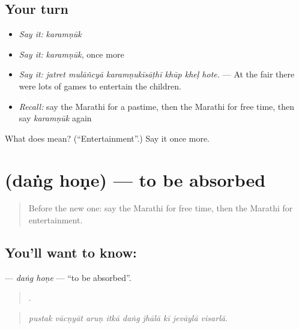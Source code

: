 \subsection*{Your turn}
\begin{itemize}
\raggedright
  \item \emph{Say it:} \emph{karamṇūk}
  \item \emph{Say it:} \emph{karamṇūk}, once more
  \item \emph{Say it:} \emph{jatret mulāñcyā karamṇukīsāṭhī khūp kheḷ hote.} — At the fair there were lots of games to entertain the children.
  \item \emph{Recall:} say the Marathi for a pastime, then the Marathi for free time, then say \emph{karamṇūk} again
\end{itemize}

\begin{tcolorbox}[breakable,colback=teal!4,colframe=teal!35!black,title={Before you move on}]
What does  mean? (\textquotedblleft{}Entertainment\textquotedblright{}.) Say it once more.
\end{tcolorbox}
\section[\texorpdfstring{\mr{दंग} \mr{होणे} (daṅg hoṇe)}{दंग होणे (daṅg hoṇe)}]{  (daṅg hoṇe) — to be absorbed}

\label{lesson:MR-C528-dang-hone}



\begin{quote}
Before the new one: say the Marathi for free time, then the Marathi for entertainment.
\end{quote}

\subsection*{You'll want to know:  }
\textbf{ } — \emph{daṅg hoṇe} — \textquotedblleft{}to be absorbed\textquotedblright{}.

\begin{quote}
        .
\end{quote}

\begin{quote}
\emph{pustak vācṇyāt aruṇ itkā daṅg jhālā kī jevāylā visarlā.}
\end{quote}

